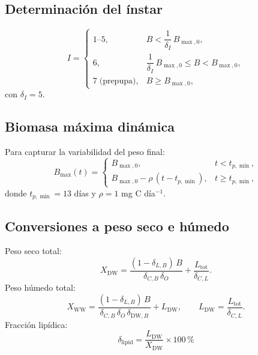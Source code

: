 \subsection{Determinaci\'{o}n del \'{i}nstar}
\begin{equation}
    I =
    \begin{cases}
        1\text{--}5, & B < \dfrac{1}{\delta_I}\,B_{\max,0}, \\[8pt]
        6, & \dfrac{1}{\delta_I}\,B_{\max,0} \le B < B_{\max,0}, \\[8pt]
        7\;\text{(prepupa)}, & B \ge B_{\max,0},
    \end{cases}
\end{equation}
con $\delta_I = 5$.

\subsection{Biomasa m\'{a}xima din\'{a}mica}
Para capturar la variabilidad del peso final:
\begin{equation}
    B_{\max}(t) =
    \begin{cases}
        B_{\max,0}, & t < t_{p,\min}, \\[4pt]
        B_{\max,0} - \rho\,(t - t_{p,\min}), & t \ge t_{p,\min},
    \end{cases}
\end{equation}
donde $t_{p,\min}=13$ d\'{i}as y $\rho = 1$ mg C d\'{i}a$^{-1}$.

\subsection{Conversiones a peso seco e h\'{u}medo}
Peso seco total:
\begin{equation}
    X_{\text{DW}} = \frac{(1-\delta_{L,B})\,B}{\delta_{C,B}\,\delta_O} + \frac{L_{\text{tot}}}{\delta_{C,L}}.
\end{equation}
Peso h\'{u}medo total:
\begin{equation}
    X_{\text{WW}} = \frac{(1-\delta_{L,B})\,B}{\delta_{C,B}\,\delta_O\,\delta_{\text{DW},B}} + L_{\text{DW}},
    \qquad L_{\text{DW}} = \frac{L_{\text{tot}}}{\delta_{C,L}}.
\end{equation}
Fracci\'{o}n lip\'{i}dica:
\begin{equation}
    \delta_{\text{lipid}} = \frac{L_{\text{DW}}}{X_{\text{DW}}} \times 100\,\si{\percent}
\end{equation}

